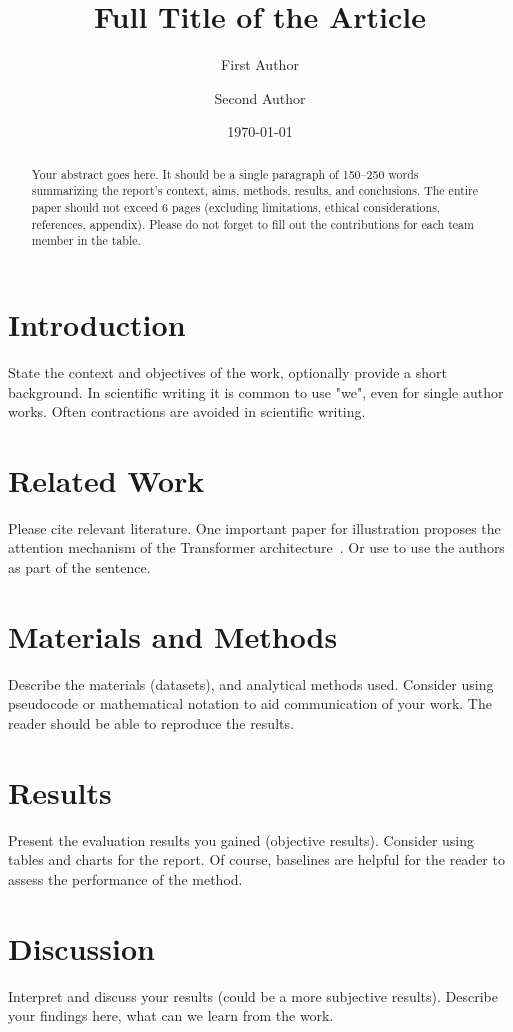\documentclass[12pt,a4paper,twocolumn]{article}
\title{Full Title of the Article} %
\author[1]{First Author} %
\author[2]{Second Author}
\affil[1]{Graz University of Technology, Graz, Austria}
\affil[2]{University of Graz, Graz, Austria}
\date{\today}
\begin{document}
\maketitle

\begin{abstract}
    Your abstract goes here. It should be a single paragraph of 150--250 words summarizing the report’s context, aims, methods, results, and conclusions.
    The entire paper should not exceed 6 pages (excluding limitations, ethical considerations, references, appendix).
    Please do not forget to fill out the contributions for each team member in the table.
\end{abstract}

\section{Introduction}
\label{sec:intro}
State the context and objectives of the work, optionally provide a short background.
In scientific writing it is common to use "we", even for single author works.
Often contractions are avoided in scientific writing.

\section{Related Work}
Please cite relevant literature.
One important paper for illustration proposes the attention mechanism of the Transformer architecture~\citep{vaswani2017attention}.
Or use \citet{vaswani2017attention} to use the authors as part of the sentence.

\section{Materials and Methods}
\label{sec:methods}
Describe the materials (datasets), and analytical methods used.
Consider using pseudocode or mathematical notation to aid communication of your work.
The reader should be able to reproduce the results.

\section{Results}
\label{sec:results}
Present the evaluation results you gained (objective results). 
Consider using tables and charts for the report.
Of course, baselines are helpful for the reader to assess the performance of the method.

\section{Discussion}
\label{sec:discussion}
Interpret and discuss your results (could be a more subjective results).
Describe your findings here, what can we learn from the work.
\end{document}
